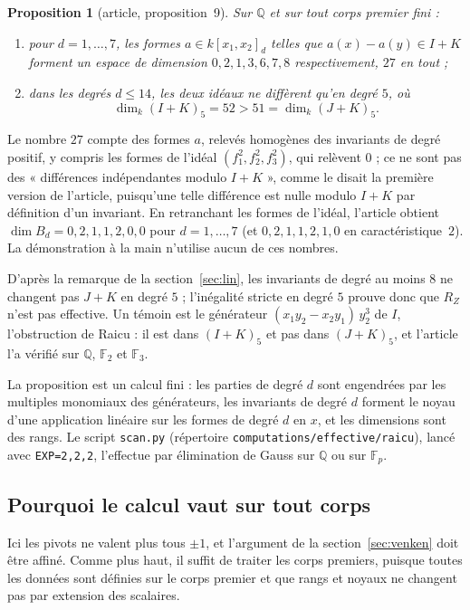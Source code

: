\documentclass[11pt,a4paper]{amsart}
\theoremstyle{definition}
\theoremstyle{plain}
\newtheorem*{proposition}{Proposition}
\theoremstyle{remark}
\newcommand{\F}{\mathbb F}
\newcommand{\Q}{\mathbb Q}
\begin{document}
\begin{proposition}[article, proposition~9]
Sur $\Q$ et sur tout corps premier fini :
\begin{enumerate}
\item pour $d = 1, \dots, 7$, les formes $a \in k[x_1, x_2]_d$ telles que $a(x) - a(y) \in I + K$ forment un espace de dimension $0, 2, 1, 3, 6, 7, 8$ respectivement, $27$ en tout ;
\item dans les degrés $d \le 14$, les deux idéaux ne diffèrent qu'en degré $5$, où
\[
\dim_k (I + K)_5 = 52 > 51 = \dim_k (J + K)_5.
\]
\end{enumerate}
\end{proposition}

Le nombre $27$ compte des formes $a$, relevés homogènes des invariants de degré positif, y compris les formes de l'idéal $(f_1^2, f_2^2, f_3^2)$, qui relèvent $0$ ; ce ne sont pas des « différences indépendantes modulo $I + K$ », comme le disait la première version de l'article, puisqu'une telle différence est nulle modulo $I + K$ par définition d'un invariant. En retranchant les formes de l'idéal, l'article obtient $\dim B_d = 0, 2, 1, 1, 2, 0, 0$ pour $d = 1, \dots, 7$ (et $0, 2, 1, 1, 2, 1, 0$ en caractéristique~$2$). La démonstration à la main n'utilise aucun de ces nombres.

D'après la remarque de la section~\ref{sec:lin}, les invariants de degré au moins $8$ ne changent pas $J + K$ en degré $5$ ; l'inégalité stricte en degré $5$ prouve donc que $R_Z$ n'est pas effective. Un témoin est le générateur $(x_1y_2 - x_2y_1)\,y_2^3$ de $I$, l'obstruction de Raicu : il est dans $(I + K)_5$ et pas dans $(J + K)_5$, et l'article l'a vérifié sur $\Q$, $\F_2$ et $\F_3$.

La proposition est un calcul fini : les parties de degré $d$ sont engendrées par les multiples monomiaux des générateurs, les invariants de degré $d$ forment le noyau d'une application linéaire sur les formes de degré $d$ en $x$, et les dimensions sont des rangs. Le script \texttt{scan.py} (répertoire \texttt{computations/\allowbreak effective/\allowbreak raicu}), lancé avec \texttt{EXP=2,2,2}, l'effectue par élimination de Gauss sur $\Q$ ou sur $\F_p$.

\subsection{Pourquoi le calcul vaut sur tout corps}

Ici les pivots ne valent plus tous $\pm 1$, et l'argument de la section~\ref{sec:venken} doit être affiné. Comme plus haut, il suffit de traiter les corps premiers, puisque toutes les données sont définies sur le corps premier et que rangs et noyaux ne changent pas par extension des scalaires.
\end{document}
